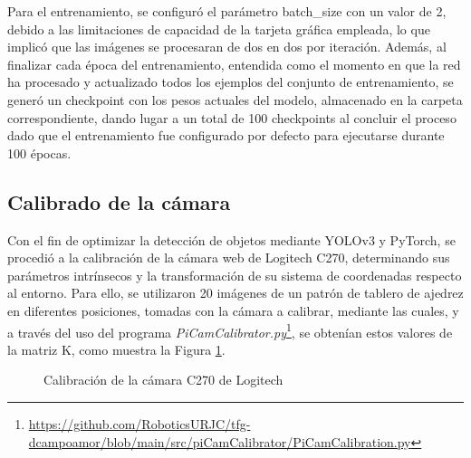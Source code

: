 Para el entrenamiento, se configuró el parámetro batch\_size con un valor de 2, debido a las limitaciones de capacidad de la tarjeta gráfica empleada, lo que implicó que las imágenes se procesaran de dos en dos por iteración. Además, al finalizar cada época del entrenamiento, entendida como el momento en que la red ha procesado y actualizado todos los ejemplos del conjunto de entrenamiento, se generó un checkpoint con los pesos actuales del modelo, almacenado en la carpeta correspondiente, dando lugar a un total de 100 checkpoints al concluir el proceso dado que el entrenamiento fue configurado por defecto para ejecutarse durante 100 épocas.

\subsection{Calibrado de la cámara}
\label{sec:Calibrado_camara}

Con el fin de optimizar la detección de objetos mediante YOLOv3 y PyTorch, se procedió a la calibración de la cámara web de Logitech C270, determinando sus parámetros intrínsecos y la transformación de su sistema de coordenadas respecto al entorno. Para ello, se utilizaron 20 imágenes de un patrón de tablero de ajedrez en diferentes posiciones, tomadas con la cámara a calibrar, mediante las cuales, y a través del uso del programa \textit{PiCamCalibrator.py}\footnote{\url{https://github.com/RoboticsURJC/tfg-dcampoamor/blob/main/src/piCamCalibrator/PiCamCalibration.py}}, se obtenían estos valores de la matriz K, como muestra la Figura \ref{fig:calibracion_camara}. 

 \begin{figure}[H]
    \begin{center}
      \subcapcentertrue
      \hspace{2mm}
    \end{center}
    \caption{Calibración de la cámara C270 de Logitech}
    \label{fig:calibracion_camara}
  \end{figure}


